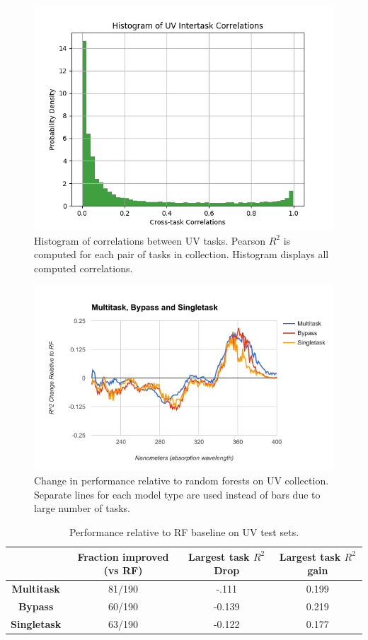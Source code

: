 \begin{figure}[H]
  \includegraphics[width=.75\textwidth]{Images/UV_correlations.png}
  \caption{Histogram of correlations between UV tasks. Pearson $R^2$ is computed for each pair of tasks in collection. Histogram displays all computed correlations.}
  \label{fig:uv-corrs}
\end{figure}
\begin{figure}[H]
  \includegraphics[width=.9\textwidth]{Images/UV_imp.png}
  \caption{Change in performance relative to random forests on UV collection. Separate lines for each model type are used instead of bars due to large number of tasks.}
  \label{fig:uv-imp}
\end{figure}
\begin{table}[h]
    \centering
    \begin{tabular}{ |c|c|c|c| } 
    \hline
     & Fraction improved (vs RF)  & Largest task $R^2$ Drop & Largest task $R^2$ gain \\ 
    \hline
    \textbf{Multitask} & 81/190 &  -.111 & 0.199  \\
    \hline
    \textbf{Bypass} & 60/190 & -0.139 & 0.219  \\
    \hline
    \textbf{Singletask} & 63/190  & -0.122  & 0.177  \\
    \hline
    \end{tabular}
    \caption{Performance relative to RF baseline on UV test sets.}
    \label{tab:uv-comp}
\end{table}



